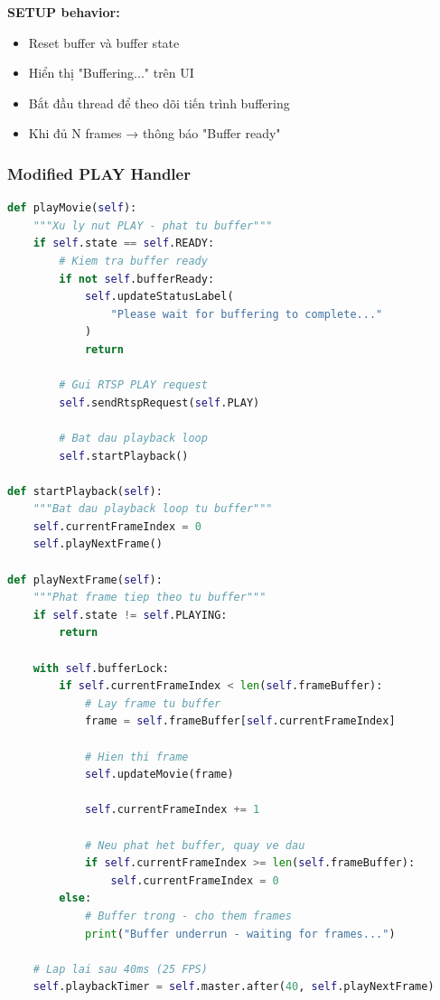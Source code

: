 \documentclass[a4paper,12pt]{article}
\begin{document}
\textbf{SETUP behavior:}
\begin{itemize}
    \item Reset buffer và buffer state
    \item Hiển thị "Buffering..." trên UI
    \item Bắt đầu thread để theo dõi tiến trình buffering
    \item Khi đủ N frames → thông báo "Buffer ready"
\end{itemize}

\subsubsection{Modified PLAY Handler}

\begin{lstlisting}[language=Python, caption={PLAY from Buffer}]
def playMovie(self):
    """Xu ly nut PLAY - phat tu buffer"""
    if self.state == self.READY:
        # Kiem tra buffer ready
        if not self.bufferReady:
            self.updateStatusLabel(
                "Please wait for buffering to complete..."
            )
            return
        
        # Gui RTSP PLAY request
        self.sendRtspRequest(self.PLAY)
        
        # Bat dau playback loop
        self.startPlayback()

def startPlayback(self):
    """Bat dau playback loop tu buffer"""
    self.currentFrameIndex = 0
    self.playNextFrame()

def playNextFrame(self):
    """Phat frame tiep theo tu buffer"""
    if self.state != self.PLAYING:
        return
    
    with self.bufferLock:
        if self.currentFrameIndex < len(self.frameBuffer):
            # Lay frame tu buffer
            frame = self.frameBuffer[self.currentFrameIndex]
            
            # Hien thi frame
            self.updateMovie(frame)
            
            self.currentFrameIndex += 1
            
            # Neu phat het buffer, quay ve dau
            if self.currentFrameIndex >= len(self.frameBuffer):
                self.currentFrameIndex = 0
        else:
            # Buffer trong - cho them frames
            print("Buffer underrun - waiting for frames...")
    
    # Lap lai sau 40ms (25 FPS)
    self.playbackTimer = self.master.after(40, self.playNextFrame)
\end{lstlisting}
\end{document}
